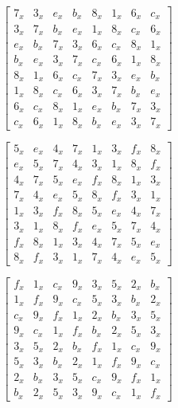 \begin{equation}\label{mat:whirlwind-m0-inv}
\begin{bmatrix}
7_x & 3_x & e_x & b_x & 8_x & 1_x & 6_x & c_x\\
3_x & 7_x & b_x & e_x & 1_x & 8_x & c_x & 6_x\\
e_x & b_x & 7_x & 3_x & 6_x & c_x & 8_x & 1_x\\
b_x & e_x & 3_x & 7_x & c_x & 6_x & 1_x & 8_x\\
8_x & 1_x & 6_x & c_x & 7_x & 3_x & e_x & b_x\\
1_x & 8_x & c_x & 6_x & 3_x & 7_x & b_x & e_x\\
6_x & c_x & 8_x & 1_x & e_x & b_x & 7_x & 3_x\\
c_x & 6_x & 1_x & 8_x & b_x & e_x & 3_x & 7_x
\end{bmatrix}
\end{equation}

\begin{equation}\label{mat:whirlwind-m1}
\begin{bmatrix}
5_x & e_x & 4_x & 7_x & 1_x & 3_x & f_x & 8_x\\
e_x & 5_x & 7_x & 4_x & 3_x & 1_x & 8_x & f_x\\
4_x & 7_x & 5_x & e_x & f_x & 8_x & 1_x & 3_x\\
7_x & 4_x & e_x & 5_x & 8_x & f_x & 3_x & 1_x\\
1_x & 3_x & f_x & 8_x & 5_x & e_x & 4_x & 7_x\\
3_x & 1_x & 8_x & f_x & e_x & 5_x & 7_x & 4_x\\
f_x & 8_x & 1_x & 3_x & 4_x & 7_x & 5_x & e_x\\
8_x & f_x & 3_x & 1_x & 7_x & 4_x & e_x & 5_x
\end{bmatrix}
\end{equation}

\begin{equation}\label{mat:whirlwind-m1-inv}
\begin{bmatrix}
f_x & 1_x & c_x & 9_x & 3_x & 5_x & 2_x & b_x\\
1_x & f_x & 9_x & c_x & 5_x & 3_x & b_x & 2_x\\
c_x & 9_x & f_x & 1_x & 2_x & b_x & 3_x & 5_x\\
9_x & c_x & 1_x & f_x & b_x & 2_x & 5_x & 3_x\\
3_x & 5_x & 2_x & b_x & f_x & 1_x & c_x & 9_x\\
5_x & 3_x & b_x & 2_x & 1_x & f_x & 9_x & c_x\\
2_x & b_x & 3_x & 5_x & c_x & 9_x & f_x & 1_x\\
b_x & 2_x & 5_x & 3_x & 9_x & c_x & 1_x & f_x
\end{bmatrix}
\end{equation}

